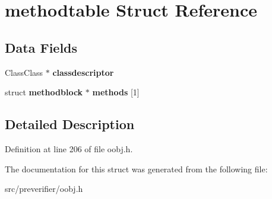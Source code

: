 \section{methodtable Struct Reference}
\label{structmethodtable}
\subsection*{Data Fields}
\begin{DoxyCompactItemize}
\item 
ClassClass $\ast$ {\bfseries classdescriptor}\label{structmethodtable_a5a1a0de4cc2d6db268a5786cdfffd325}

\item 
struct {\bf methodblock} $\ast$ {\bfseries methods} [1]\label{structmethodtable_ae19ca5d4cfe09744785a30ee9e37d091}

\end{DoxyCompactItemize}


\subsection{Detailed Description}


Definition at line 206 of file oobj.h.



The documentation for this struct was generated from the following file:\begin{DoxyCompactItemize}
\item 
src/preverifier/oobj.h\end{DoxyCompactItemize}
